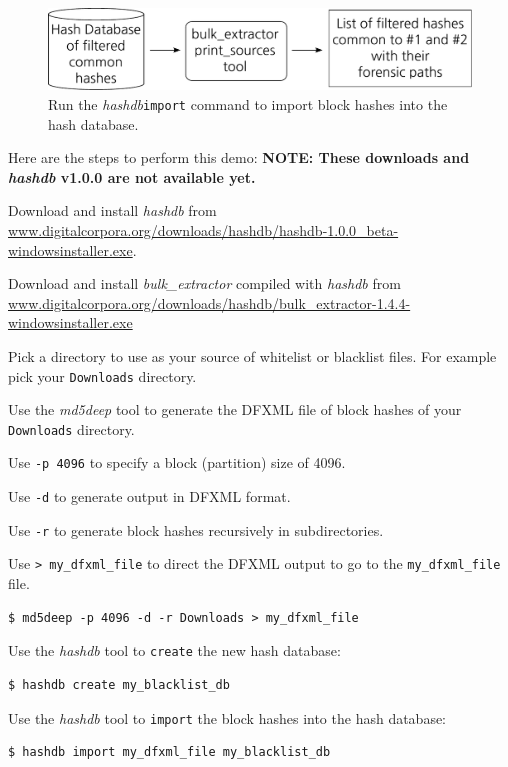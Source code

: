 \documentclass[12pt,twoside]{article}
\newcommand{\hdb}{\emph{hashdb}\xspace}
\newcommand{\bulk}{\emph{bulk\_extractor}\xspace}
\newcommand{\mdd}{\emph{md5deep}\xspace}
\begin{document}
\begin{figure}[H]
  \center
  \includegraphics[scale=0.6]{drawings/import}
  \caption*{Run the \hdb \texttt{import} command
            to import block hashes into the hash database.}
\end{figure}


Here are the steps to perform this demo:
\textbf{NOTE: These downloads and \hdb v1.0.0 are not available yet.}
\begin{compactenum}
\item Download and install \hdb from
\url{www.digitalcorpora.org/downloads/hashdb/hashdb-1.0.0\_beta-windowsinstaller.exe}.
\item Download and install \bulk compiled with \hdb from
\url{www.digitalcorpora.org/downloads/hashdb/bulk\_extractor-1.4.4-windowsinstaller.exe}
\item Pick a directory to use as your source of whitelist or blacklist files.
For example pick your \texttt{Downloads} directory.

\item Use the \mdd tool to generate the DFXML file of block hashes
of your \texttt{Downloads} directory.
\begin{compactitem}
\item Use \texttt{-p 4096} to specify a block (partition) size of 4096.
\item Use \texttt{-d} to generate output in DFXML format.
\item Use \texttt{-r} to generate block hashes recursively in subdirectories.
\item Use \texttt{> my\_dfxml\_file} to direct the DFXML output
to go to the \texttt{my\_dfxml\_file} file.
\end{compactitem}
\begin{verbatim}
$ md5deep -p 4096 -d -r Downloads > my_dfxml_file
\end{verbatim}

\item Use the \hdb tool to \texttt{create} the new hash database:
\begin{verbatim}
$ hashdb create my_blacklist_db
\end{verbatim}

\item Use the \hdb tool to \texttt{import} the block hashes
into the hash database:
\begin{verbatim}
$ hashdb import my_dfxml_file my_blacklist_db
\end{verbatim}
\end{compactenum}
\end{document}
